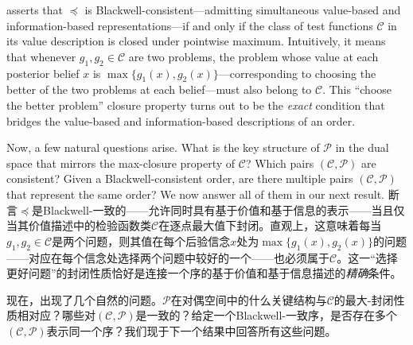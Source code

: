 \documentclass[12pt,letterpaper]{article}
\newenvironment{original}{\color{black}}{}
\newenvironment{translation}{\color{blue}}{}
\theoremstyle{plain}
\theoremstyle{definition}
\theoremstyle{remark}
\newcommand{\Pc}{\mathcal{P}}
\newcommand{\C}{\mathcal{C}}
\theoremstyle{definition}
\begin{document}
\begin{original}
 asserts that $\preceq$ is Blackwell-consistent---admitting simultaneous value-based and information-based representations---if and only if the class of test functions $\C$ in its value description is closed under pointwise maximum. Intuitively, it means that whenever $g_1, g_2 \in \C$ are two problems, the problem whose value at each posterior belief $x$ is $\max\{g_1(x), g_2(x)\}$---corresponding to choosing the better of the two problems at each belief---must also belong to $\C$. This ``choose the better problem'' closure property turns out to be the \textit{exact} condition that bridges the value-based and information-based descriptions of an order.

Now, a few natural questions arise. What is the key structure of $\Pc$ in the dual space that mirrors the max-closure property of $\C$? Which pairs $(\C, \Pc)$ are consistent? Given a Blackwell-consistent order, are there multiple pairs $(\C, \Pc)$ that represent the same order? We now answer all of them in our next result.
\end{original}
\begin{translation}
断言$\preceq$是Blackwell-一致的——允许同时具有基于价值和基于信息的表示——当且仅当其价值描述中的检验函数类$\C$在逐点最大值下封闭。直观上，这意味着每当$g_1, g_2 \in \C$是两个问题，则其值在每个后验信念$x$处为$\max\{g_1(x), g_2(x)\}$的问题——对应在每个信念处选择两个问题中较好的一个——也必须属于$\C$。这一``选择更好问题''的封闭性质恰好是连接一个序的基于价值和基于信息描述的\textit{精确}条件。

现在，出现了几个自然的问题。$\Pc$在对偶空间中的什么关键结构与$\C$的最大-封闭性质相对应？哪些对$(\C, \Pc)$是一致的？给定一个Blackwell-一致序，是否存在多个$(\C, \Pc)$表示同一个序？我们现于下一个结果中回答所有这些问题。
\end{translation}
\end{document}
